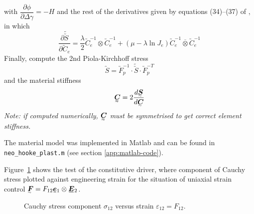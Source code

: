 with \(\dfrac{\partial \phi}{\partial \Delta \gamma} = - H\) and the rest of
the derivatives given by equations (34)--(37) of \cite{Ekh2016}, in which
\begin{equation}
  \label{eq:dSdCe}
  \frac{\partial \widetilde{\utilde{S}}}{\partial \utilde{C}_{e}} = 
  \frac{\lambda}{2} \utilde{C}_{e}^{-1} \otimes \utilde{C}_{e}^{-1} +
  \left( \mu - \lambda \ln J_{e} \right) \utilde{C}_{e}^{-1} \overline{\otimes}
  \utilde{C}_{e}^{-1}
\end{equation}
Finally, compute the 2nd Piola-Kirchhoff stress
\begin{equation}
  \label{eq:PK2final}
  \utilde{S} = \utilde{F}_{p}^{-1} \cdot \widetilde{\utilde{S}} \cdot
  \utilde{F}_{p}^{-T}
\end{equation}
and the material stiffness
\begin{equation}
  \label{eq:mat-stiff}
  \uutilde{C} = 2 \frac{d \utilde{S}}{d \utilde{C}}
\end{equation}
\textit{Note: if computed numerically, \(\uutilde{C}\) must be symmetrised to get
correct element stiffness.}

The material model was implemented in Matlab and can be found in
\texttt{neo\_hooke\_plast.m} (see section \ref{app:matlab-code}).

Figure~\ref{fig:sigma12-eps12} shows the test of the constitutive driver,
where component of Cauchy stress plotted against
engineering strain for the situation of uniaxial strain control
\(\utilde{F} = F_{12} \ubar{\bm{e}}_{1} \otimes \ubar{\bm{E}}_{2}\).
\begin{figure}[th]
  \centering
  \caption{Cauchy stress component \(\sigma_{12}\) versus strain
    \(\varepsilon_{12} = F_{12} \).}
  \label{fig:sigma12-eps12}
\end{figure}


